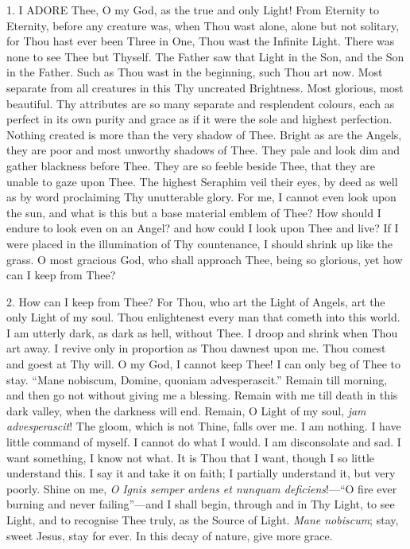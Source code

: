 
1. I ADORE
Thee, O my God, as the true and only Light! From Eternity to Eternity,
before any creature was, when Thou wast alone, alone but not solitary,
for Thou hast ever been Three in One, Thou wast the Infinite Light.
There was none to see Thee but Thyself. The Father saw that Light in the
Son, and the Son in the Father. Such as Thou wast in the beginning, such
Thou art now. Most separate from all creatures in this Thy
uncreated Brightness. Most glorious, most beautiful. Thy attributes are
so many separate and resplendent colours, each as perfect in its own
purity and grace as if it were the sole and highest perfection. Nothing
created is more than the very shadow of Thee. Bright as are the Angels,
they are poor and most unworthy shadows of Thee. They pale and look dim
and gather blackness before Thee. They are so feeble beside Thee, that
they are unable to gaze upon Thee. The highest Seraphim veil their eyes,
by deed as well as by word proclaiming Thy unutterable glory. For me, I
cannot even look upon the sun, and what is this but a base material
emblem of Thee? How should I endure to look even on an Angel? and how
could I look upon Thee and live? If I were placed in the illumination of
Thy countenance, I should shrink up like the grass. O most gracious God,
who shall approach Thee, being so glorious, yet how can I keep from
Thee?

2. How can I keep from Thee? For
Thou, who art the Light of Angels, art the only Light of my soul. Thou
enlightenest every man that cometh into this world. I am utterly dark,
as dark as hell, without Thee. I droop and shrink when Thou art away. I
revive only in proportion as Thou dawnest upon me. Thou comest and goest
at Thy will. O my God, I cannot keep Thee! I can only beg of Thee to
stay. ``Mane nobiscum, Domine, quoniam advesperascit.'' Remain till
morning, and then go not without giving me a blessing. Remain with me
till death in this dark valley, when the darkness will end.
Remain, O Light of my soul, \emph{jam advesperascit}! The gloom, which
is not Thine, falls over me. I am nothing. I have little command of
myself. I cannot do what I would. I am disconsolate and sad. I want
something, I know not what. It is Thou that I want, though I so little
understand this. I say it and take it on faith; I partially understand
it, but very poorly. Shine on me, \emph{O} \emph{Ignis semper ardens et
nunquam deficiens}!—``O fire ever burning and never failing''—and I
shall begin, through and in Thy Light, to see Light, and to recognise
Thee truly, as the Source of Light. \emph{Mane nobiscum}; stay, sweet
Jesus, stay for ever. In this decay of nature, give more grace.

